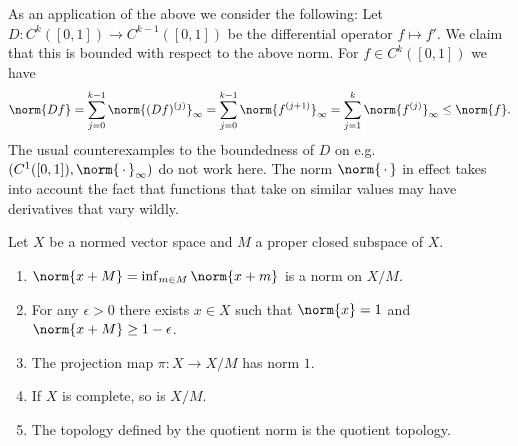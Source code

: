 \documentclass[article, a4paper, 11pt, oneside]{memoir}
\numberwithin{equation}{chapter}
\theoremstyle{nonumberplain}
\begin{document}
\begin{remark}
	As an application of the above we consider the following: Let $D \colon C^k([0,1]) \to C^{k-1}([0,1])$ be the differential operator $f \mapsto f'$. We claim that this is bounded with respect to the above norm. For $f \in C^k([0,1])$ we have
	\begin{equation*}
		\norm{Df}
			= \sum_{j=0}^{k-1} \norm{(Df)^{(j)}}_\infty
			= \sum_{j=0}^{k-1} \norm{f^{(j+1)}}_\infty
			= \sum_{j=1}^k \norm{f^{(j)}}_\infty
			\leq \norm{f}.
	\end{equation*}
	The usual counterexamples to the boundedness of $D$ on e.g. $(C^1([0,1]), \norm{\,\cdot\,}_\infty)$ do not work here. The norm $\norm{\,\cdot\,}$ in effect takes into account the fact that functions that take on similar values may have derivatives that vary wildly.
\end{remark}


\begin{exerciseframed*}[12]
	Let $X$ be a normed vector space and $M$ a proper closed subspace of $X$.
	\begin{enumerate}
		\item $\norm{x + M} = \inf_{m \in M} \norm{x + m}$ is a norm on $X/M$.
		\item For any $\epsilon > 0$ there exists $x \in X$ such that $\norm{x} = 1$ and $\norm{x + M} \geq 1 - \epsilon$.
		\item The projection map $\pi \colon X \to X/M$ has norm $1$.
		\item If $X$ is complete, so is $X/M$.
		\item The topology defined by the quotient norm is the quotient topology.
	\end{enumerate}
\end{exerciseframed*}
\end{document}
